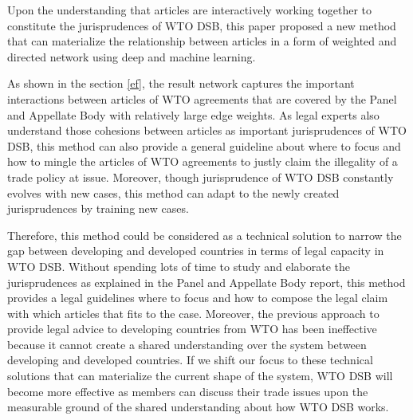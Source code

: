 Upon the understanding that articles are interactively working together to
constitute the jurisprudences of WTO DSB,
this paper proposed a new method that can materialize the relationship between articles
in a form of weighted and directed network using deep and machine learning.
 
As shown in the section \ref{ef}, the result network captures the important interactions
between articles of WTO agreements that are covered by the Panel and Appellate Body with relatively large edge weights.
As legal experts also understand those cohesions between articles as important jurisprudences of WTO DSB,
this method can also provide a general guideline about where to focus and how to mingle the articles of WTO agreements to justly claim
the illegality of a trade policy at issue. 
Moreover, though jurisprudence of WTO DSB constantly
evolves with new cases, this method can adapt to the newly created jurisprudences by training new cases.
 
Therefore, this method could be considered as a technical solution to narrow the gap between developing and developed countries in terms of legal capacity in WTO DSB.
Without spending lots of time to study and elaborate the jurisprudences as explained in the Panel and Appellate Body report, this method provides a legal guidelines where to focus and how to compose the legal claim with which articles that fits to the case.
Moreover, the previous approach to provide legal advice to developing countries from WTO has been ineffective because it cannot create a shared understanding over the system between developing and developed countries.
If we shift our focus to these technical solutions that can materialize the current shape of the system, WTO DSB
will become more effective as members can discuss their trade issues upon the measurable ground of the shared understanding about how WTO DSB works.

